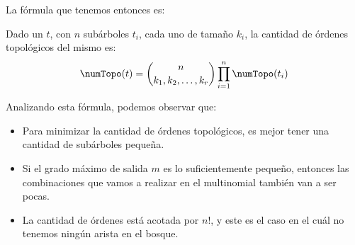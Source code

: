 
La fórmula que tenemos entonces es: 

\begin{definition}\label{for:topoCountingDTrees}
Dado un \dtree{} $t$, con $n$ subárboles $t_i$, cada uno de tamaño $k_i$, la cantidad de órdenes topológicos del mismo es: 
    \begin{align}
      \numTopo(t) =  \binom{n}{k_1, k_2, \ldots, k_r} \prod_{i=1}^{n} \numTopo(t_i)  
    \end{align}
\end{definition}


Analizando esta fórmula, podemos observar que:

\begin{itemize}
    \item Para minimizar la cantidad de órdenes topológicos, es mejor tener una cantidad de subárboles pequeña. %
    \item Si el grado máximo de salida $m$ es lo suficientemente pequeño, entonces las combinaciones que vamos a realizar en el multinomial también van a ser pocas. %
    
    \item La cantidad de órdenes está acotada por $n!$, y este es el caso en el cuál no tenemos ningún arista en el bosque. 
    
\end{itemize}

